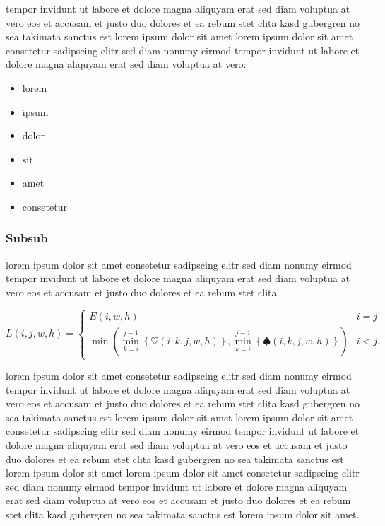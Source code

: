 tempor invidunt ut labore et dolore magna aliquyam erat sed diam voluptua at
vero eos et accusam et justo duo dolores et ea rebum stet clita kasd
gubergren no sea takimata sanctus est lorem ipsum dolor sit amet lorem ipsum
dolor sit amet consetetur sadipscing elitr sed diam nonumy eirmod tempor
invidunt ut labore et dolore magna aliquyam erat sed diam voluptua
at vero:

\begin{itemize}
   \item lorem
   \item ipsum
   \item dolor
   \item sit
   \item amet
   \item consetetur
\end{itemize}

\subsubsection{Subsub}

lorem ipsum dolor sit amet consetetur sadipscing elitr sed diam nonumy
eirmod tempor invidunt ut labore et dolore magna aliquyam erat sed diam
voluptua at vero eos et accusam et justo duo dolores et ea rebum
stet clita.~\cite{GOLDENBERGAPL02}

\begin{equation}\label{eq:apl}%
    L\left(i,j,w,h\right)=
    \begin{cases}
      E\left(i,w,h\right) & i=j\\
      \min\left(\min_{k=i}^{j-1}\left\{\heartsuit\left(i,k,j,w,h\right)\right\},
                \min_{k=i}^{j-1}\left\{\spadesuit\left(i,k,j,w,h\right)\right\}\right) & i<j\text{.}
    \end{cases}
\end{equation}

lorem ipsum dolor sit amet consetetur sadipscing elitr sed diam nonumy
eirmod tempor invidunt ut labore et dolore magna aliquyam erat sed diam
voluptua at vero eos et accusam et justo duo dolores et ea rebum stet clita
kasd gubergren no sea takimata sanctus est lorem ipsum dolor sit amet lorem
ipsum dolor sit amet consetetur sadipscing elitr sed diam nonumy eirmod
tempor invidunt ut labore et dolore magna aliquyam erat sed diam voluptua at
vero eos et accusam et justo duo dolores et ea rebum stet clita kasd
gubergren no sea takimata sanctus est lorem ipsum dolor sit amet lorem ipsum
dolor sit amet consetetur sadipscing elitr sed diam nonumy eirmod tempor
invidunt ut labore et dolore magna aliquyam erat sed diam voluptua at vero
eos et accusam et justo duo dolores et ea rebum stet clita kasd gubergren no
sea takimata sanctus est lorem ipsum dolor sit amet.

